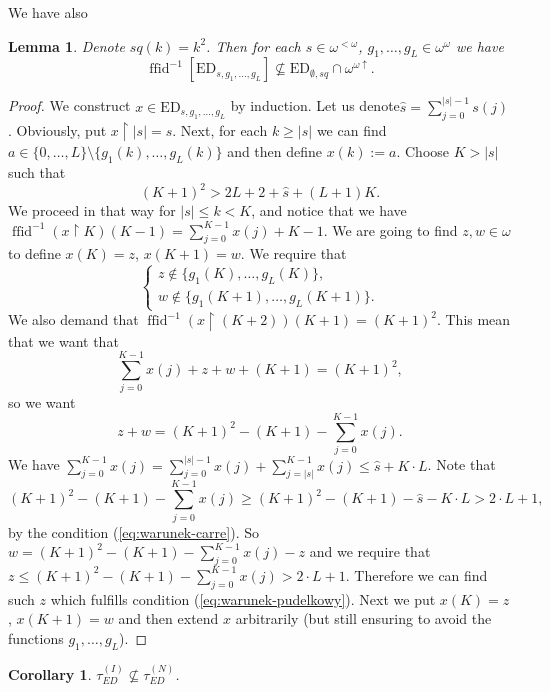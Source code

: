 \documentclass[12pt]{amsart}
\theoremstyle{plain}
\newtheorem{lemma}[theorem]{Lemma}
\newtheorem{corollary}[theorem]{Corollary}
\theoremstyle{definition}
\theoremstyle{remark}
\newcommand{\baire}{\omega^{\omega}}
\newcommand{\finbaire}{\omega^{<\omega}}
\newcommand{\incrbaire}{\omega^{\omega \uparrow}}
\newcommand{\EventuallyDifferent}[2]{\mathrm{ED}_{#1,#2}}
\newcommand{\EventuallyDifferentNative}{\tau_{\mathit{ED}}^{(N)}}
\newcommand{\EventuallyDifferentInduced}{\tau_{\mathit{ED}}^{(I)}}
\DeclareMathOperator{\ffid}{ffid}
\newcommand{\carre}{\mathit{sq}}
\begin{document}
We have also
\begin{lemma}
  Denote $\carre(k) = k^2$. Then
for each $s \in \finbaire$, $g_1,\ldots, g_L \in \baire$
we have
\[
  \ffid^{-1} [\EventuallyDifferent{s}{g_1, \ldots, g_L}]
  \not\subseteq \EventuallyDifferent{\emptyset}{\carre}\cap\incrbaire.
\]
\end{lemma}
\begin{proof}
  We construct $x \in \EventuallyDifferent{s}{g_1, \ldots, g_L}$ by induction.
  Let us denote\linebreak $\hat{s} = \sum_{j=0}^{|s| - 1} s(j)$.
  Obviously, put $x \restriction |s| = s$. Next, for
  each $k \geq |s|$ we can find
  $a \in \lbrace 0, \ldots, L\rbrace \setminus \lbrace g_1(k), \ldots, g_L(k)\rbrace$
  and then define $x(k) := a$.
  Choose $K > |s|$ such that
  \begin{equation}\label{eq:warunek-carre}
  (K + 1)^2 > 2L + 2 + \hat{s} + (L + 1)K.
  \end{equation}
  We proceed in that way for $|s| \leq k < K$,
  and notice that we have
  $\ffid^{-1}(x\restriction K)(K - 1) = \sum_{j=0}^{K-1} x(j) + K - 1$.
  We are going to find $z, w \in \omega$ to define
  $x(K) = z$, $x(K + 1) = w$.
  We require that
  \begin{equation}\label{eq:warunek-pudelkowy}
    \begin{cases}
      z \not\in \lbrace g_1(K),\ldots, g_L(K)\rbrace,\\
      w \not\in \lbrace g_1(K + 1),\ldots, g_L(K + 1)\rbrace.
     \end{cases}
  \end{equation}
  We also demand that
  $\ffid^{-1}(x \restriction (K + 2)) (K + 1) = (K + 1)^2$.
  This mean that we want that
  \[
   \sum_{j = 0}^{K - 1} x(j) + z + w + (K + 1) = (K + 1)^2,
  \]
  so we want
  \[
    z + w = (K + 1)^2 - (K + 1) - \sum_{j = 0}^{K - 1} x(j).
  \]
  We have
  $\sum_{j = 0}^{K - 1} x(j) = \sum_{j = 0}^{|s| - 1} x(j) +  \sum_{j = |s|}^{K - 1} x(j)
  \leq \hat{s} + K \cdot L$.
  Note that
\[
  (K + 1)^2 - (K + 1) - \sum_{j = 0}^{K - 1} x(j) \geq
  (K + 1)^2 - (K + 1) - \hat{s} - K \cdot L > 2\cdot L + 1,
\]
by the condition (\ref{eq:warunek-carre}).
So $w = (K + 1)^2 - (K + 1) - \sum_{j = 0}^{K - 1} x(j) - z$
and we require that $z \leq  (K + 1)^2 - (K + 1) - \sum_{j = 0}^{K - 1} x(j) > 2 \cdot L + 1$.
Therefore we can find such $z$ which fulfills condition (\ref{eq:warunek-pudelkowy}).
Next we put $x(K) = z$, $x(K + 1) = w$ and then extend $x$ arbitrarily
(but still ensuring to avoid the functions $g_1, \ldots, g_L$).
\end{proof}
\begin{corollary}
$\EventuallyDifferentInduced \not\subseteq \EventuallyDifferentNative$.
\end{corollary}
\end{document}
